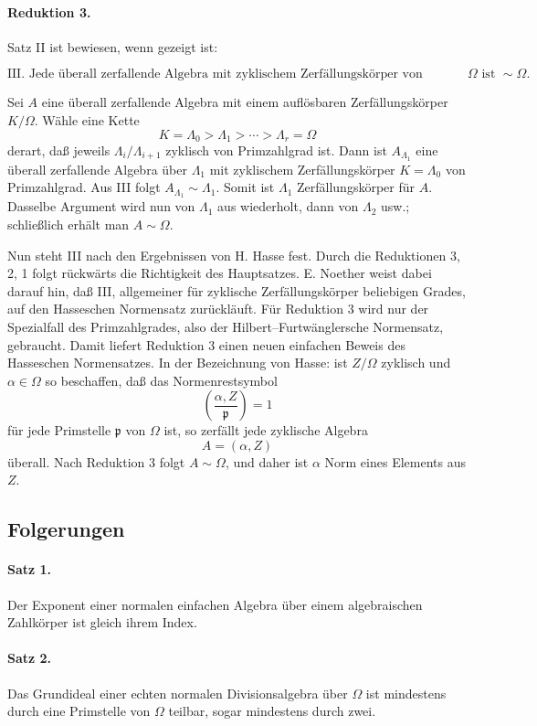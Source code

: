 \documentclass[11pt]{article}
\providecommand{\Om}{\Omega}
\begin{document}
\paragraph{Reduktion 3.}
Satz II ist bewiesen, wenn gezeigt ist:

\[
\text{III. Jede überall zerfallende Algebra mit zyklischem Zerfällungskörper von Primzahlgrad über }\Om
\text{ ist } \sim\Om .
\]

Sei \(A\) eine überall zerfallende Algebra mit einem auflösbaren Zerfällungskörper \(K/\Om\). Wähle eine Kette
\[
        K=\Lambda_0>\Lambda_1>\cdots>\Lambda_r=\Om
\]
derart, daß jeweils \(\Lambda_i/\Lambda_{i+1}\) zyklisch von Primzahlgrad ist. Dann ist \(A_{\Lambda_1}\) eine überall zerfallende Algebra über \(\Lambda_1\) mit zyklischem Zerfällungskörper \(K=\Lambda_0\) von Primzahlgrad. Aus III folgt \(A_{\Lambda_1}\sim\Lambda_1\). Somit ist \(\Lambda_1\) Zerfällungskörper für \(A\). Dasselbe Argument wird nun von \(\Lambda_1\) aus wiederholt, dann von \(\Lambda_2\) usw.; schließlich erhält man \(A\sim\Om\).

Nun steht III nach den Ergebnissen von H. Hasse fest. Durch die Reduktionen 3, 2, 1 folgt rückwärts die Richtigkeit des Hauptsatzes. E. Noether weist dabei darauf hin, daß III, allgemeiner für zyklische Zerfällungskörper beliebigen Grades, auf den Hasseschen Normensatz zurückläuft. Für Reduktion 3 wird nur der Spezialfall des Primzahlgrades, also der Hilbert--Furtwänglersche Normensatz, gebraucht. Damit liefert Reduktion 3 einen neuen einfachen Beweis des Hasseschen Normensatzes. In der Bezeichnung von Hasse: ist \(Z/\Om\) zyklisch und \(\alpha\in\Om\) so beschaffen, daß das Normenrestsymbol
\[
        \left(\frac{\alpha,Z}{\mathfrak p}\right)=1
\]
für jede Primstelle \(\mathfrak p\) von \(\Om\) ist, so zerfällt jede zyklische Algebra
\[
        A=(\alpha,Z)
\]
überall. Nach Reduktion 3 folgt \(A\sim\Om\), und daher ist \(\alpha\) Norm eines Elements aus \(Z\).

\subsection*{Folgerungen}

\paragraph{Satz 1.}
Der Exponent einer normalen einfachen Algebra über einem algebraischen Zahlkörper ist gleich ihrem Index.

\paragraph{Satz 2.}
Das Grundideal einer echten normalen Divisionsalgebra über \(\Om\) ist mindestens durch eine Primstelle von \(\Om\) teilbar, sogar mindestens durch zwei.
\end{document}
